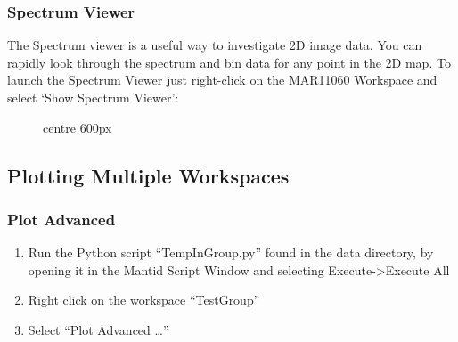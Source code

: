 \documentclass[letterpaper,10pt,english,openany]{sphinxmanual}
\let\sphinxpxdimen\pdfpxdimen\else\newdimen\sphinxpxdimen
\begin{document}
\begin{figure}[H]
\centering

\noindent\sphinxincludegraphics[width=400\sphinxpxdimen]{{400px-ContourPlot}.png}
\end{figure}


\subsubsection{Spectrum Viewer}
\label{\detokenize{mantid_basic_course/loading_and_displaying_data/04_displaying_2D_data:spectrum-viewer}}
The Spectrum viewer is a useful way to investigate 2D image data. You
can rapidly look through the spectrum and bin data for any point in the
2D map. To launch the Spectrum Viewer just right-click on the MAR11060
Workspace and select ‘Show Spectrum Viewer’:

\begin{figure}[H]
\centering
\capstart

\noindent{}
\caption{centre \textbar{} 600px}\label{\detokenize{mantid_basic_course/loading_and_displaying_data/04_displaying_2D_data:id2}}\end{figure}




\subsection{Plotting Multiple Workspaces}
\label{\detokenize{mantid_basic_course/loading_and_displaying_data/05_plotting_multiple_workspaces:plotting-multiple-workspaces}}\label{\detokenize{mantid_basic_course/loading_and_displaying_data/05_plotting_multiple_workspaces:id1}}\label{\detokenize{mantid_basic_course/loading_and_displaying_data/05_plotting_multiple_workspaces::doc}}

\subsubsection{Plot Advanced}
\label{\detokenize{mantid_basic_course/loading_and_displaying_data/05_plotting_multiple_workspaces:plot-advanced}}\begin{enumerate}
\def\theenumi{\arabic{enumi}}
\def\labelenumi{\theenumi .}
\makeatletter\def\p@enumii{\p@enumi \theenumi .}\makeatother
\item {} 
Run the Python script “TempInGroup.py” found in the data directory,
by opening it in the Mantid Script Window and selecting
Execute-\textgreater{}Execute All

\item {} 
Right click on the workspace “TestGroup”

\item {} 
Select “Plot Advanced …”

\end{enumerate}
\end{document}

